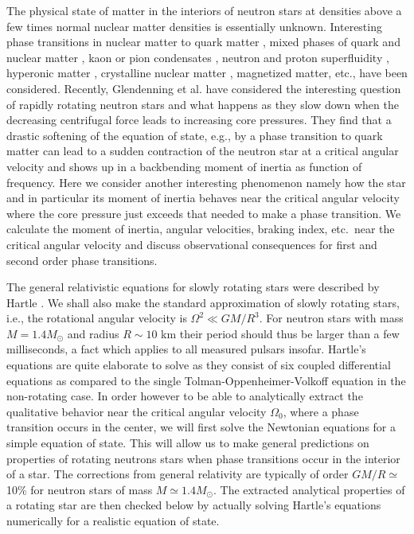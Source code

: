 \begin{multicols}{2}

The physical state of matter in the interiors of neutron stars at
densities above a few times normal nuclear matter densities is
essentially unknown. Interesting phase transitions in nuclear matter 
to quark matter \cite{star_properties},
mixed phases of quark and nuclear matter \cite{Glendenning,HPS}, kaon
\cite{Kaplan} or pion condensates \cite{pion,vijay}, 
neutron and proton superfluidity \cite{oeystein},
hyperonic matter \cite{star_properties,Glendenning},
crystalline nuclear matter \cite{pion}, magnetized matter, etc., have
been considered.  Recently, Glendenning et al. \cite{GPW} have
considered the interesting question of rapidly rotating neutron stars
and what happens as they slow down when the decreasing centrifugal
force leads to increasing core pressures.  They find that a drastic
softening of the equation of state, e.g., by a phase transition to
quark matter can lead to a sudden contraction of the neutron star at
a critical angular velocity and shows up in a backbending moment of
inertia as function of frequency.  Here we consider another
interesting phenomenon namely how the star and in particular its moment
of inertia behaves near the critical angular velocity where the core
pressure just exceeds that needed to make a phase transition. We
calculate the moment of inertia, angular velocities, braking
index, etc.\ near the critical angular velocity and discuss
observational consequences for first and second order phase
transitions.


The general relativistic equations for slowly rotating stars were 
described by Hartle \cite{Hartle}. 
We shall also make the standard approximation of slowly
rotating stars, i.e., the rotational angular velocity is
$\Omega^2 \ll GM/R^3$.
For neutron stars with mass $M=1.4M_\odot$ and
radius $R\sim 10$ km their period should thus be larger than a few
milliseconds, a fact which applies to all measured pulsars insofar.
Hartle's equations are quite elaborate to solve
as they consist of six coupled differential equations as compared to
the single Tolman-Oppenheimer-Volkoff 
equation \cite{TOV} in the non-rotating case.
In order however to be able to analytically
extract the qualitative behavior near the critical angular velocity
$\Omega_0$, where a
phase transition occurs in the center, we will first solve the
Newtonian equations for a simple equation of state.
This will allow us to make general predictions on properties
of rotating neutrons stars when phase transitions occur in the interior
of a star.
The corrections from general relativity are typically of order
$GM/R\simeq$10\% for neutron stars of mass $M\simeq 1.4M_\odot$.
The extracted analytical properties of a rotating star 
are then  checked below by actually solving 
Hartle's equations numerically for a realistic equation of state.
 

\end{multicols}
